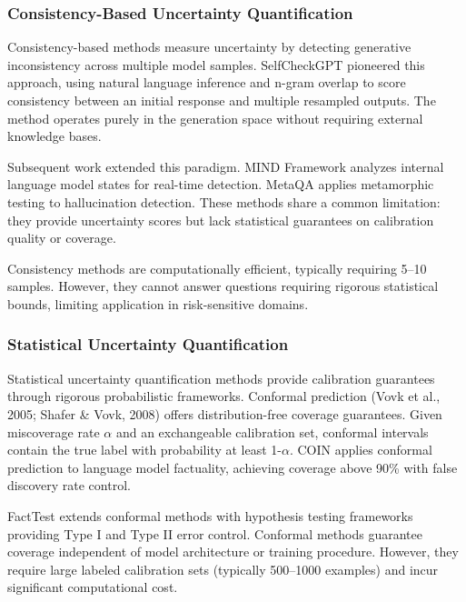 
\subsubsection{Consistency-Based Uncertainty Quantification}

Consistency-based methods measure uncertainty by detecting generative inconsistency across multiple model samples. SelfCheckGPT \citep{manakul2023selfcheckgpt} pioneered this approach, using natural language inference and n-gram overlap to score consistency between an initial response and multiple resampled outputs. The method operates purely in the generation space without requiring external knowledge bases.

Subsequent work extended this paradigm. MIND Framework \citep{chen2024mind} analyzes internal language model states for real-time detection. MetaQA \citep{guo2024metaqa} applies metamorphic testing to hallucination detection. These methods share a common limitation: they provide uncertainty scores but lack statistical guarantees on calibration quality or coverage.

Consistency methods are computationally efficient, typically requiring 5--10 samples. However, they cannot answer questions requiring rigorous statistical bounds, limiting application in risk-sensitive domains.

\subsubsection{Statistical Uncertainty Quantification}

Statistical uncertainty quantification methods provide calibration guarantees through rigorous probabilistic frameworks. Conformal prediction (Vovk et al., 2005; Shafer \& Vovk, 2008) offers distribution-free coverage guarantees. Given miscoverage rate $\alpha$ and an exchangeable calibration set, conformal intervals contain the true label with probability at least 1-$\alpha$. COIN \citep{wang2025coin} applies conformal prediction to language model factuality, achieving coverage above 90\% with false discovery rate control.

FactTest \citep{nie2024facttest} extends conformal methods with hypothesis testing frameworks providing Type I and Type II error control. Conformal methods guarantee coverage independent of model architecture or training procedure. However, they require large labeled calibration sets (typically 500--1000 examples) and incur significant computational cost.

